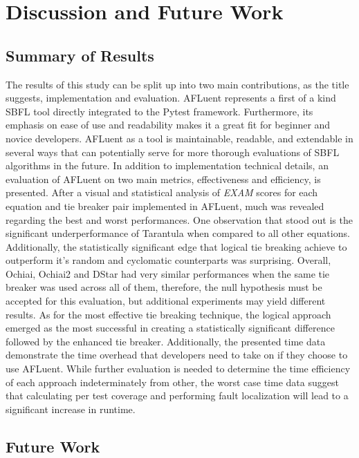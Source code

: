 \chapter{Discussion and Future Work}
\label{ch:conclusion}

\section{Summary of Results}

The results of this study can be split up into two main contributions, as the
title suggests, implementation and evaluation. AFLuent represents a first of a
kind SBFL tool directly integrated to the Pytest framework. Furthermore, its
emphasis on ease of use and readability makes it a great fit for beginner and
novice developers. AFLuent as a tool is maintainable, readable, and extendable
in several ways that can potentially serve for more thorough evaluations
of SBFL algorithms in the future. In addition to implementation technical
details, an evaluation of AFLuent on two main metrics, effectiveness and
efficiency, is presented. After a visual and statistical analysis of \emph{EXAM} scores for each equation
and tie breaker pair implemented in AFLuent, much was revealed regarding the
best and worst performances. One observation that stood out
is the significant underperformance of Tarantula when compared to all other
equations. Additionally, the statistically significant edge that logical tie
breaking achieve to outperform it's random and cyclomatic counterparts was
surprising. Overall, Ochiai, Ochiai2 and DStar had very similar performances
when the same tie breaker was used across all of them, therefore, the null
hypothesis must be accepted for this evaluation, but additional experiments may
yield different results. As for the most effective tie breaking technique, the
logical approach emerged as the most successful in creating a statistically
significant difference followed by the enhanced tie breaker.
Additionally, the presented time data demonstrate the
time overhead that developers need to take on if they choose to use
AFLuent. While further evaluation is needed to determine the time efficiency of
each approach indeterminately from other, the worst case time data suggest that
calculating per test coverage and performing fault localization will lead to a
significant increase in runtime.

\section{Future Work}
\label{sec:future_work}

